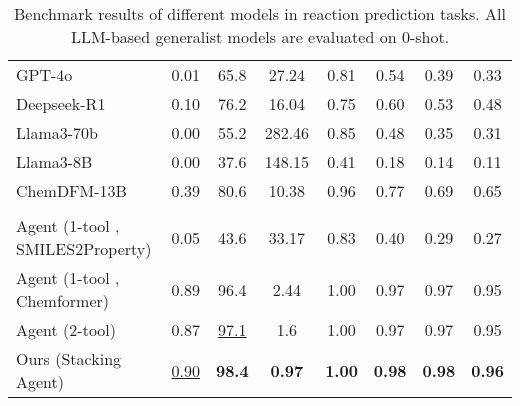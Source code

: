 \begin{table}[!htb]
{\begin{tabular}{lccccccc}
        GPT-4o~\cite{openai2024gpt4ocard}      & 0.01 & 65.8 & 27.24  & 0.81 & 0.54 & 0.39 & 0.33 \\
Deepseek-R1~\cite{deepseekai2025deepseekr1incentivizingreasoningcapability} & 0.10 & 76.2 & 16.04  & 0.75 & 0.60 & 0.53 & 0.48 \\
Llama3-70b~\cite{llama3modelcard}  & 0.00 & 55.2 & 282.46 & 0.85 & 0.48 & 0.35 & 0.31 \\
Llama3-8B~\cite{llama3modelcard}   & 0.00 & 37.6 & 148.15 & 0.41 & 0.18 & 0.14 & 0.11 \\
ChemDFM-13B~\cite{zhao2024chemdfmlargelanguagefoundation} & 0.39 & 80.6 & 10.38  & 0.96 & 0.77 & 0.69 & 0.65 \\
        \midrule
        \rowcolor{lightgray} \multicolumn{8}{c}{\textit{Tool-based Agent models}} \\
Agent (1-tool , SMILES2Property) & 0.05       & 43.6          & 33.17         & 0.83          & 0.40          & 0.29          & 0.27          \\
Agent (1-tool , Chemformer)      & 0.89       & 96.4          & 2.44          & 1.00          & 0.97          & 0.97          & 0.95          \\
Agent (2-tool)                   & 0.87       & \underline{97.1}    & 1.6           & 1.00          & 0.97          & 0.97          & 0.95          \\
Ours (Stacking Agent)            & \underline{0.90} & \textbf{98.4} & \textbf{0.97} & \textbf{1.00} & \textbf{0.98} & \textbf{0.98} & \textbf{0.96}
\\
        \bottomrule
    \end{tabular}
    }
    \caption{Benchmark results of different models in reaction prediction tasks. All LLM-based generalist models are evaluated on 0-shot.}
    \label{tab:reaction_prediction}
\end{table}


